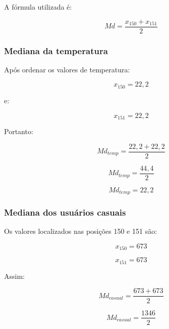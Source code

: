\documentclass[12pt,a4paper]{article}
\begin{document}
A fórmula utilizada é:

\begin{equation}
Md =
\frac{x_{150} + x_{151}}{2}
\end{equation}

\subsubsection*{Mediana da temperatura}

Após ordenar os valores de temperatura:

\begin{equation}
x_{150} = 22{,}2
\end{equation}

e:

\begin{equation}
x_{151} = 22{,}2
\end{equation}

Portanto:

\begin{equation}
Md_{temp} =
\frac{22{,}2 + 22{,}2}{2}
\end{equation}

\begin{equation}
Md_{temp} =
\frac{44{,}4}{2}
\end{equation}

\begin{equation}
\boxed{Md_{temp} = 22{,}2}
\end{equation}

\subsubsection*{Mediana dos usuários casuais}

Os valores localizados nas posições 150 e 151 são:

\begin{equation}
x_{150} = 673
\end{equation}

\begin{equation}
x_{151} = 673
\end{equation}

Assim:

\begin{equation}
Md_{casual} =
\frac{673 + 673}{2}
\end{equation}

\begin{equation}
Md_{casual} =
\frac{1346}{2}
\end{equation}
\end{document}
